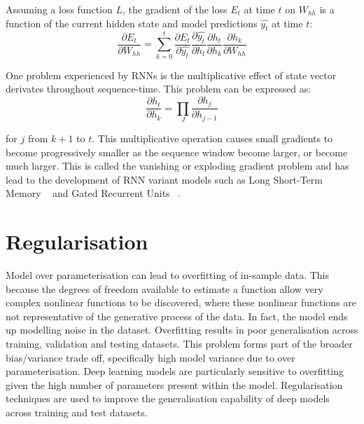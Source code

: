 \noindent Assuming a loss function $L$, the gradient of the loss $E_t$ at time $t$ on $W_{hh}$ is a function of the current hidden state and model predictions $\hat{y_t}$ at time $t$:  
\begin{equation}
	\frac{\partial E_t} {\partial W_{hh}} = \sum_{k=0}^{t}\frac{\partial E_t} {\partial \hat{y_t}}\frac{\partial \hat{y_t}} {\partial h_t}\frac{\partial h_t} {\partial h_k}\frac{\partial h_k} {\partial W_{hh}}
\end{equation}

\noindent One problem experienced by RNNs is the multiplicative effect of state vector derivates throughout sequence-time. This problem can be expressed as:
\begin{equation}
	\frac{\partial h_t} {\partial h_k} = \prod_J\frac{\partial h_j} {\partial h_{j-1}}
\end{equation}

\noindent for $j$ from $k + 1$ to $t$. This multiplicative operation causes small gradients to become progressively smaller as the sequence window become larger, or become much larger. This is called the vanishing or exploding gradient problem and has lead to the development of RNN variant models such as Long Short-Term Memory \unskip ~\citep{hochreiter1997long} and Gated Recurrent Units \unskip ~\citep{cho2014learning}.



\section{Regularisation}

Model over parameterisation can lead to overfitting of in-sample data. This because the degrees of freedom available to estimate a function allow very complex nonlinear functions to be discovered, where these nonlinear functions are not representative of the generative process of the data. In fact, the model ends up modelling noise in the dataset. Overfitting results in poor generalisation across training, validation and testing datasets. This problem forms part of the broader bias/variance trade off, specifically high model variance due to over parameterisation. Deep learning models are particularly sensitive to overfitting given the high number of parameters present within the model. Regularisation techniques are used to improve the generalisation capability of deep models across training and test datasets. \bigskip

